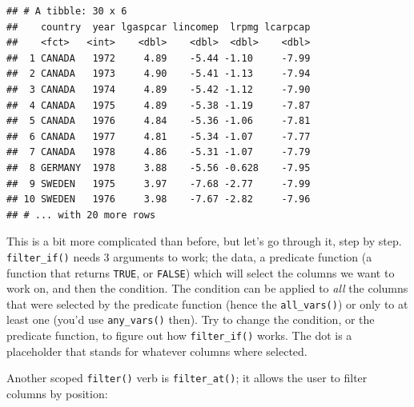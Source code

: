 \documentclass[]{gitbook}
\newenvironment{Shaded}{\begin{snugshade}}{\end{snugshade}}
\newcommand{\DecValTok}[1]{\textcolor[rgb]{0.00,0.00,0.81}{#1}}
\newcommand{\KeywordTok}[1]{\textcolor[rgb]{0.13,0.29,0.53}{\textbf{#1}}}
\newcommand{\NormalTok}[1]{#1}
\newcommand{\OperatorTok}[1]{\textcolor[rgb]{0.81,0.36,0.00}{\textbf{#1}}}
\newcommand{\StringTok}[1]{\textcolor[rgb]{0.31,0.60,0.02}{#1}}
\theoremstyle{definition}
\theoremstyle{definition}
\theoremstyle{definition}
\theoremstyle{remark}
\begin{document}
\begin{Shaded}
\end{Shaded}

\begin{verbatim}
## # A tibble: 30 x 6
##    country  year lgaspcar lincomep  lrpmg lcarpcap
##    <fct>   <int>    <dbl>    <dbl>  <dbl>    <dbl>
##  1 CANADA   1972     4.89    -5.44 -1.10     -7.99
##  2 CANADA   1973     4.90    -5.41 -1.13     -7.94
##  3 CANADA   1974     4.89    -5.42 -1.12     -7.90
##  4 CANADA   1975     4.89    -5.38 -1.19     -7.87
##  5 CANADA   1976     4.84    -5.36 -1.06     -7.81
##  6 CANADA   1977     4.81    -5.34 -1.07     -7.77
##  7 CANADA   1978     4.86    -5.31 -1.07     -7.79
##  8 GERMANY  1978     3.88    -5.56 -0.628    -7.95
##  9 SWEDEN   1975     3.97    -7.68 -2.77     -7.99
## 10 SWEDEN   1976     3.98    -7.67 -2.82     -7.96
## # ... with 20 more rows
\end{verbatim}

This is a bit more complicated than before, but let's go through it,
step by step. \texttt{filter\_if()} needs 3 arguments to work; the data,
a predicate function (a function that returns \texttt{TRUE}, or
\texttt{FALSE}) which will select the columns we want to work on, and
then the condition. The condition can be applied to \emph{all} the
columns that were selected by the predicate function (hence the
\texttt{all\_vars()}) or only to at least one (you'd use
\texttt{any\_vars()} then). Try to change the condition, or the
predicate function, to figure out how \texttt{filter\_if()} works. The
dot is a placeholder that stands for whatever columns where selected.

Another scoped \texttt{filter()} verb is \texttt{filter\_at()}; it
allows the user to filter columns by position:

\begin{Shaded}
\end{Shaded}
\end{document}
